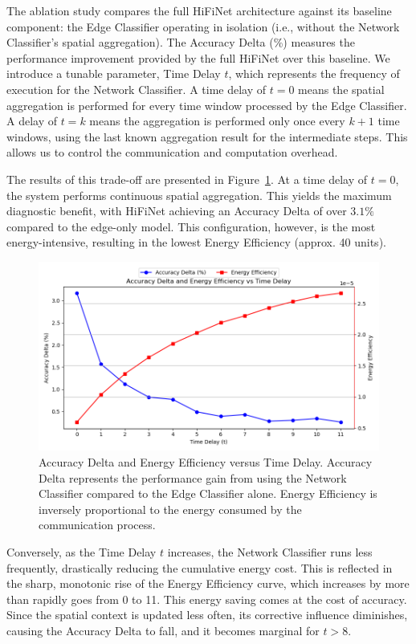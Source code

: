 The ablation study compares the full HiFiNet architecture against its baseline component: the Edge Classifier operating in isolation (i.e., without the Network Classifier's spatial aggregation). The Accuracy Delta (\%) measures the performance improvement provided by the full HiFiNet over this baseline. We introduce a tunable parameter, Time Delay \(t\), which represents the frequency of execution for the Network Classifier. A time delay of \(t=0\) means the spatial aggregation is performed for every time window processed by the Edge Classifier. A delay of $t=k$ means the aggregation is performed only once every \(k+1\) time windows, using the last known aggregation result for the intermediate steps. This allows us to control the communication and computation overhead.

The results of this trade-off are presented in Figure~\ref{fig:accuracy_tradeoff}. At a time delay of \(t=0\), the system performs continuous spatial aggregation. This yields the maximum diagnostic benefit, with HiFiNet achieving an Accuracy Delta of over \(3.1\%\) compared to the edge-only model. This configuration, however, is the most energy-intensive, resulting in the lowest Energy Efficiency (approx. 40 units).

\begin{figure}
    \centering
    \includegraphics[width=\textwidth]{images/accuracy_tradeoff.png} 
    \caption{Accuracy Delta and Energy Efficiency versus Time Delay.  Accuracy Delta represents the performance gain from using the Network Classifier compared to the Edge Classifier alone. Energy Efficiency is inversely proportional to the energy consumed by the communication process.}
    \label{fig:accuracy_tradeoff}
\end{figure}

Conversely, as the Time Delay \(t\) increases, the Network Classifier runs less frequently, drastically reducing the cumulative energy cost. This is reflected in the sharp, monotonic rise of the Energy Efficiency curve, which increases by more than rapidly goes from 0 to 11. This energy saving comes at the cost of accuracy. Since the spatial context is updated less often, its corrective influence diminishes, causing the Accuracy Delta to fall,  and it becomes marginal for $t > 8$.

